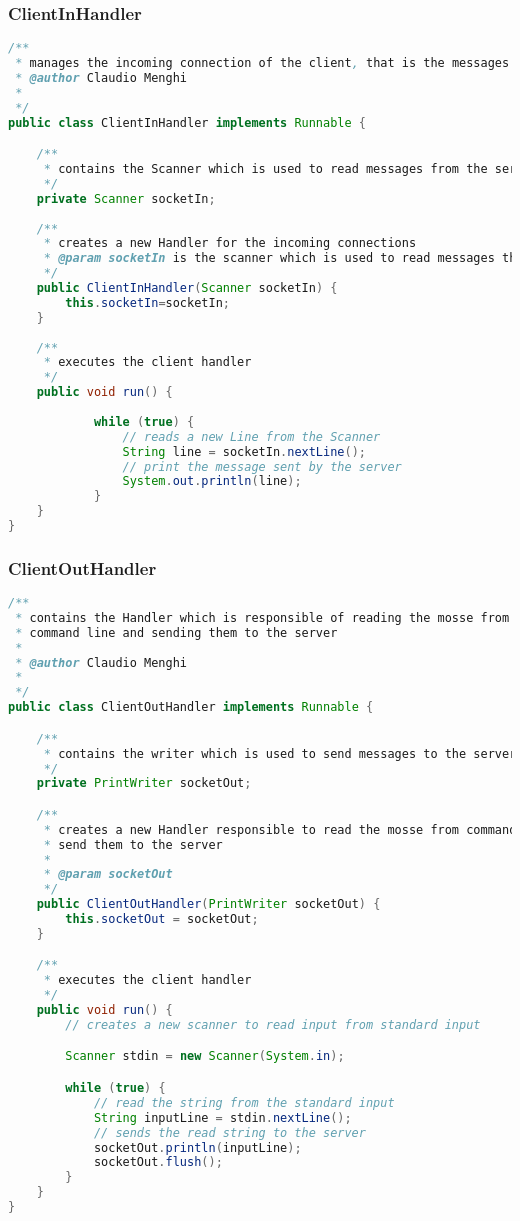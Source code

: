 \documentclass{article}
\begin{document}
\subsubsection{ClientInHandler}
\begin{lstlisting}[language=Java,escapechar=|]
/**
 * manages the incoming connection of the client, that is the messages sent from the server to the client
 * @author Claudio Menghi
 *
 */
public class ClientInHandler implements Runnable {

	/**
	 * contains the Scanner which is used to read messages from the server
	 */
	private Scanner socketIn;
	
	/**
	 * creates a new Handler for the incoming connections
	 * @param socketIn is the scanner which is used to read messages that are sent from the server
	 */
	public ClientInHandler(Scanner socketIn) {
		this.socketIn=socketIn;
	}
	
	/**
	 * executes the client handler
	 */
	public void run() {
			
			while (true) {
				// reads a new Line from the Scanner
				String line = socketIn.nextLine();
				// print the message sent by the server
				System.out.println(line);
			}
	}
}
\end{lstlisting}

\subsubsection{ClientOutHandler}
\begin{lstlisting}[language=Java,escapechar=|]
/**
 * contains the Handler which is responsible of reading the mosse from the
 * command line and sending them to the server
 * 
 * @author Claudio Menghi
 * 
 */
public class ClientOutHandler implements Runnable {

	/**
	 * contains the writer which is used to send messages to the server
	 */
	private PrintWriter socketOut;

	/**
	 * creates a new Handler responsible to read the mosse from command line and
	 * send them to the server
	 * 
	 * @param socketOut
	 */
	public ClientOutHandler(PrintWriter socketOut) {
		this.socketOut = socketOut;
	}

	/**
	 * executes the client handler
	 */
	public void run() {
		// creates a new scanner to read input from standard input

		Scanner stdin = new Scanner(System.in);

		while (true) {
			// read the string from the standard input
			String inputLine = stdin.nextLine();
			// sends the read string to the server
			socketOut.println(inputLine);
			socketOut.flush();
		}
	}
}
\end{lstlisting}
\end{document}
